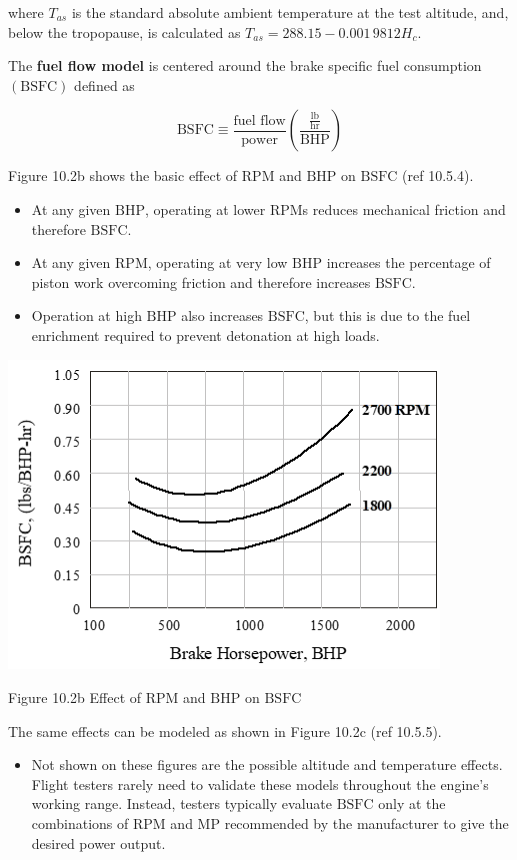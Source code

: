 \documentclass[
]{book}
\providecommand{\tightlist}{%
  \setlength{\itemsep}{0pt}\setlength{\parskip}{0pt}}
\begin{document}
where \(T_{as}\) is the standard absolute ambient temperature at the test altitude, and, below the tropopause, is calculated as \(T_{as} = 288.15 - 0.001\,9812 H_c\).

The \textbf{fuel flow model} is centered around the brake specific fuel consumption \(\left( \mathrm{BSFC} \right)\) defined as

\[
\mathrm{BSFC} \equiv \frac{\text{fuel flow}}{\text{power}} \left( \frac{ \frac{\text{lb}}{\text{hr}} }{\mathrm{BHP}} \right)
\]

Figure 10.2b shows the basic effect of \(\mathrm{RPM}\) and \(\mathrm{BHP}\) on \(\mathrm{BSFC}\) (ref 10.5.4).

\begin{itemize}
\tightlist
\item
  At any given \(\mathrm{BHP}\), operating at lower \(\mathrm{RPM}\)s reduces mechanical friction and therefore \(\mathrm{BSFC}\).
\item
  At any given \(\mathrm{RPM}\), operating at very low \(\mathrm{BHP}\) increases the percentage of piston work overcoming friction and therefore increases \(\mathrm{BSFC}\).
\item
  Operation at high \(\mathrm{BHP}\) also increases \(\mathrm{BSFC}\), but this is due to the fuel enrichment required to prevent detonation at high loads.
\end{itemize}

\includegraphics[width=4.49931in,height=3.22847in]{media/10/image9.png}

Figure 10.2b Effect of \(\mathrm{RPM}\) and \(\mathrm{BHP}\) on \(\mathrm{BSFC}\)

The same effects can be modeled as shown in Figure 10.2c (ref 10.5.5).

\begin{itemize}
\tightlist
\item
  Not shown on these figures are the possible altitude and temperature effects. Flight testers rarely need to validate these models throughout the engine's working range. Instead, testers typically evaluate \(\mathrm{BSFC}\) only at the combinations of \(\mathrm{RPM}\) and \(\mathrm{MP}\) recommended by the manufacturer to give the desired power output.
\end{itemize}
\end{document}
